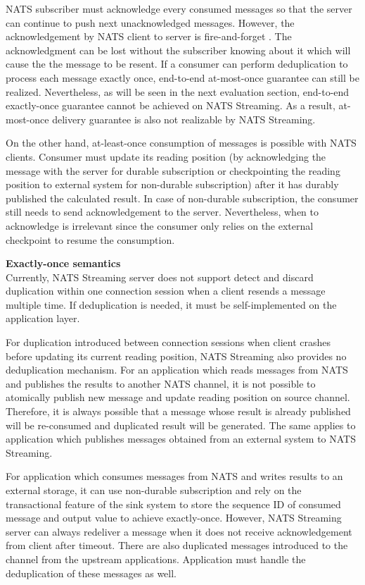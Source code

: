 NATS subscriber must acknowledge every consumed messages so that the server can continue to push next unacknowledged messages. However, the acknowledgement by NATS client to server is fire-and-forget \cite{natsorder}. The acknowledgment can be lost without the subscriber knowing about it which will cause the the message to be resent. If a consumer can perform deduplication to process each message exactly once, end-to-end at-most-once guarantee can still be realized. Nevertheless, as will be seen in the next evaluation section, end-to-end exactly-once guarantee cannot be achieved on NATS Streaming. As a result, at-most-once delivery guarantee is also not realizable by NATS Streaming.

On the other hand, at-least-once consumption of messages is possible with NATS clients. Consumer must update its reading position (by acknowledging the message with the server for durable subscription or checkpointing the reading position to external system for non-durable subscription) after it has durably published the calculated result. In case of non-durable subscription, the consumer still needs to send acknowledgement to the server. Nevertheless, when to acknowledge is irrelevant since the consumer only relies on the external checkpoint to resume the consumption. 

\textbf{Exactly-once semantics}\\
Currently, NATS Streaming server does not support detect and discard duplication within one connection session when a client resends a message multiple time. If deduplication is needed, it must be self-implemented on the application layer. 

For duplication introduced between connection sessions when client crashes before updating its current reading position, NATS Streaming also provides no deduplication mechanism. For an application which reads messages from NATS and publishes the results to another NATS channel, it is not possible to atomically publish new message and update reading position on source channel. Therefore, it is always possible that a message whose result is already published will be re-consumed and duplicated result will be generated. The same applies to application which publishes messages obtained from an external system to NATS Streaming.

For application which consumes messages from NATS and writes results to an external storage, it can use non-durable subscription and rely on the transactional feature of the sink system to store the sequence ID of consumed message and output value to achieve exactly-once. However, NATS Streaming server can always redeliver a message when it does not receive acknowledgement from client after timeout. There are also duplicated messages introduced to the channel from the upstream applications. Application must handle the deduplication of these messages as well.

